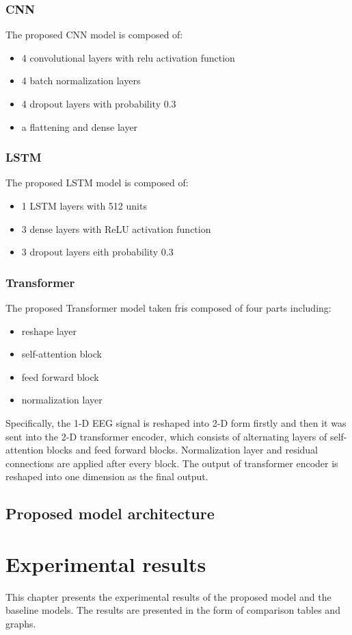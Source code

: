 \documentclass[a4paper]{sapthesis}
\begin{document}
\subsection{CNN}\label{sec:model_cnn}
The proposed CNN model is composed of: 
\begin{itemize}
\item 4 convolutional layers with relu activation function
\item 4 batch normalization layers
\item 4 dropout layers with probability 0.3
\item a flattening and dense layer
\end{itemize}
\subsection{LSTM}\label{sec:model_lstm}
The proposed LSTM model is composed of:
\begin{itemize}
\item 1 LSTM layers with 512 units
\item 3 dense layers with ReLU activation function
\item 3 dropout layers eith probability 0.3
\end{itemize}
\subsection{Transformer}\label{sec:model_transformer}
The proposed Transformer model taken fris composed of four parts including:
\begin{itemize}
\item reshape layer
\item self-attention block
\item feed forward block
\item normalization layer
\end{itemize}
 Specifically, the 1-D EEG signal is reshaped into 2-D form firstly and then 
 it was sent into the 2-D transformer encoder, which consists of 
 alternating layers of self-attention blocks and feed forward blocks. 
 Normalization layer and residual connections are applied after every block.
  The output of transformer encoder is reshaped into one dimension as the
   final output. 
\section{Proposed model architecture}\label{sec:model_proposed}
\chapter{Experimental results}
This chapter presents the experimental results of the proposed model and
the baseline models. The results are presented in the form of comparison tables
and graphs. 
\end{document}
